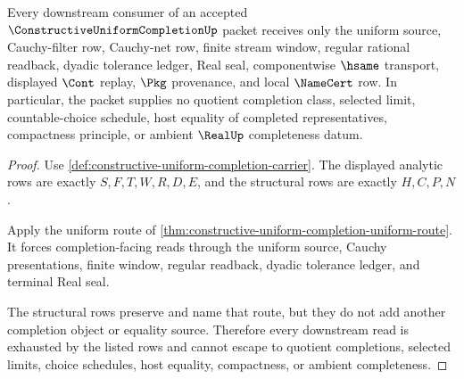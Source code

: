 \begin{theorem}
\label{thm:constructive-uniform-completion-nonescape}
Every downstream consumer of an accepted $\ConstructiveUniformCompletionUp$ packet receives only the uniform source, Cauchy-filter row, Cauchy-net row, finite stream window, regular rational readback, dyadic tolerance ledger, Real seal, componentwise $\hsame$ transport, displayed $\Cont$ replay, $\Pkg$ provenance, and local $\NameCert$ row. In particular, the packet supplies no quotient completion class, selected limit, countable-choice schedule, host equality of completed representatives, compactness principle, or ambient $\RealUp$ completeness datum.
\end{theorem}
\begin{proof}
Use \autoref{def:constructive-uniform-completion-carrier}. The displayed analytic rows are exactly $S,F,T,W,R,D,E$, and the structural rows are exactly $H,C,P,N$.

Apply the uniform route of \autoref{thm:constructive-uniform-completion-uniform-route}. It forces completion-facing reads through the uniform source, Cauchy presentations, finite window, regular readback, dyadic tolerance ledger, and terminal Real seal.

The structural rows preserve and name that route, but they do not add another completion object or equality source. Therefore every downstream read is exhausted by the listed rows and cannot escape to quotient completions, selected limits, choice schedules, host equality, compactness, or ambient completeness.
\end{proof}



